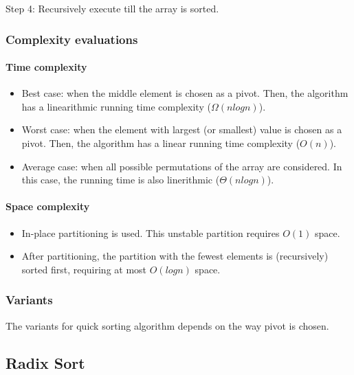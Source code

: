 \documentclass{article}
\newcommand\tab[1][0.5cm]{\hspace*{#1}}
\begin{document}
Step 4: Recursively execute till the array is sorted.

\subsubsection{Complexity evaluations}

\paragraph{\tab Time complexity}

\begin{itemize}
    \item Best case: when the middle element is chosen as a pivot. Then, the algorithm has a linearithmic running time complexity ($\Omega(nlogn)$).
    
    \item Worst case: when the element with largest (or smallest) value is chosen as a pivot. Then, the algorithm has a linear running time complexity ($O(n)$).
    
    \item Average case: when all possible permutations of the array are considered. In this case, the running time is also linerithmic ($\Theta(nlogn)$).
\end{itemize}

\paragraph{\tab Space complexity}

\begin{itemize}
    \item In-place partitioning is used. This unstable partition requires $O(1)$ space.
    \item After partitioning, the partition with the fewest elements is (recursively) sorted first, requiring at most $O(logn)$ space.
\end{itemize}

\subsubsection{Variants}

\tab The variants for quick sorting algorithm depends on the way pivot is chosen.

\pagebreak


\subsection{Radix Sort}
\end{document}
